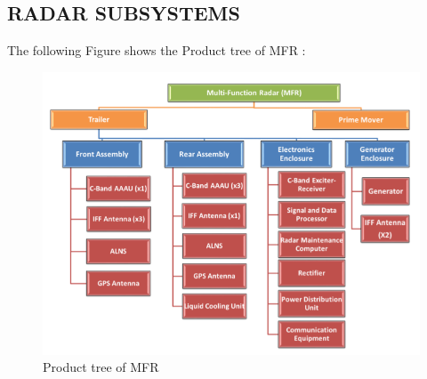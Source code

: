\documentclass[12pt]{article} %
\begin{document}
\subsection{RADAR SUBSYSTEMS}
\noindent The following Figure shows the Product tree of MFR : 
 \begin{figure}[H]
  \includegraphics[width=\linewidth]{MFR.png}
  \caption{Product tree of MFR}
  \label{fig:figure 11}
\end{figure}
\end{document}
